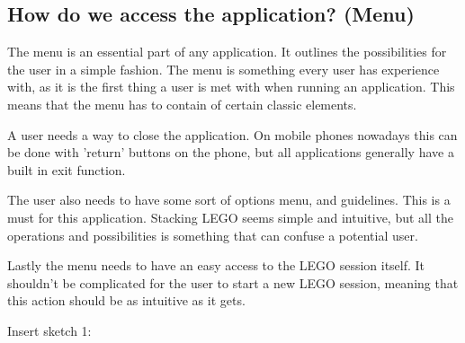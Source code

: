 \documentclass[11pt]{article}
\begin{document}
\subsection{How do we access the application? (Menu)}
The menu is an essential part of any application. It outlines the possibilities for the user in a simple fashion. The menu is something every user has experience with, as it is the first thing a user is met with when running an application. This means that the menu has to contain of certain classic elements.\par A user needs a way to close the application. On mobile phones nowadays this can be done with 'return' buttons on the phone, but all applications generally have a built in exit function.\par
The user also needs to have some sort of options menu, and guidelines. This is a must for this application. Stacking LEGO seems simple and intuitive, but all the operations and possibilities is something that can confuse a potential user. \par
Lastly the menu needs to have an easy access to the LEGO session itself. It shouldn't be complicated for the user to start a new LEGO session, meaning that this action should be as intuitive as it gets.\par
\begin{center}
	Insert sketch 1:
\end{center}

\end{document}
